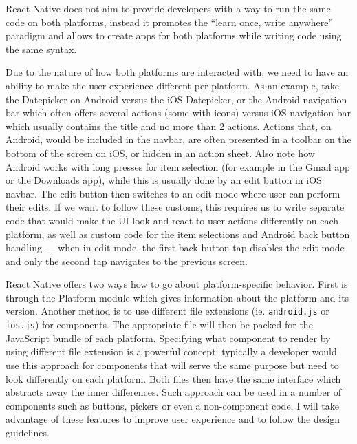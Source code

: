 React Native does not aim to provide developers with a way to run the same code on both platforms, instead it promotes the “learn once, write anywhere” paradigm and allows to create apps for both platforms while writing code using the same syntax.


Due to the nature of how both platforms are interacted with, we need to have an ability to make the user experience different per platform. As an example, take the Datepicker on Android versus the iOS Datepicker, or the Android navigation bar which often offers several actions (some with icons) versus iOS navigation bar which usually contains the title and no more than 2 actions. 
Actions that, on Android, would be included in the navbar, are often presented in a toolbar on the bottom of the screen on iOS, or hidden in an action sheet. Also note how Android works with long presses for item selection (for example in the Gmail app or the Downloads app), while this is usually done by an edit button in iOS navbar. The edit button then switches to an edit mode where user can perform their edits. If we want to follow these customs, this requires us to write separate code that would make the UI look and react to user actions differently on each platform, as well as custom code for the item selections and Android back button handling --- when in edit mode, the first back button tap disables the edit mode and only the second tap navigates to the previous screen.


React Native offers two ways how to go about platform-specific behavior. First is through the Platform module which gives information about the platform and its version. Another method is to use different file extensions (ie. \texttt{android.js} or \texttt{ios.js}) for components. The appropriate file will then be packed for the JavaScript bundle of each platform. Specifying what component to render by using different file extension is a powerful concept: typically a developer would use this approach for components that will serve the same purpose but need to look differently on each platform. Both files then have the same interface which abstracts away the inner differences. Such approach can be used in a number of components such as buttons, pickers or even a non-component code. I will take advantage of these features to improve user experience and to follow the design guidelines.


